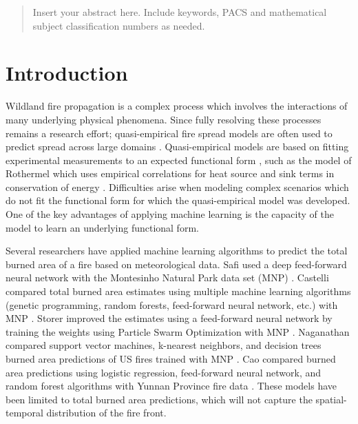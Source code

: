 \begin{abstract}
Insert your abstract here. Include keywords, PACS and mathematical
subject classification numbers as needed.







\end{abstract}




\section{Introduction}
\label{intro}

Wildland fire propagation is a complex process which involves the
interactions of many underlying physical phenomena. Since fully
resolving these processes remains a research effort; quasi-empirical
fire spread models are often used to predict spread across large domains
\cite{sullivan2007a}. Quasi-empirical models are based on fitting experimental
measurements to an expected functional form \cite{sullivan2007b}, such
as the model of Rothermel \cite{rothermel1972mathematical,scott2005standard} which uses
empirical correlations for heat source and sink terms in
conservation of energy \cite{weber1991modelling}. Difficulties arise when
modeling complex scenarios which do not fit the functional form for
which the quasi-empirical model was developed. One of the key advantages
of applying machine learning is the capacity of the model to learn an underlying
functional form.

Several researchers have applied machine learning algorithms to predict the total burned area of a fire based on
meteorological data.
Safi \etal used a deep feed-forward neural network with the Montesinho Natural Park data set (MNP) \cite{safi2013prediction}.
Castelli \etal compared total burned area estimates using multiple machine learning algorithms (genetic programming, random forests, feed-forward neural network, etc.) with MNP \cite{castelli2015predicting}.
Storer \etal improved the estimates using a feed-forward neural network by training the weights using Particle Swarm Optimization with MNP \cite{storer2016pso}.
Naganathan \etal compared support vector machines, k-nearest neighbors, and decision trees burned area predictions of US fires trained with MNP \cite{naganathan2016wildfire}.
Cao \etal compared burned area predictions using logistic regression, feed-forward neural network, and random forest algorithms with Yunnan Province fire data \cite{cao2017wildfire}.
These models have been limited to total burned area predictions, which will not capture the spatial-temporal distribution of the fire front.

